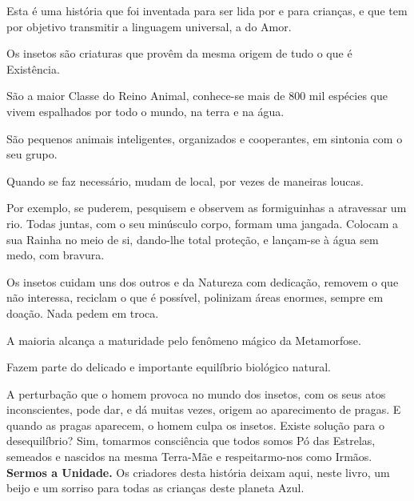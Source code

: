 Esta é uma história que foi inventada para ser lida por e para crianças, e que tem por objetivo transmitir a linguagem universal, a do Amor.

Os insetos são criaturas que provêm da mesma origem de tudo o que é Existência.

São a maior Classe do Reino Animal, conhece-se mais de 800 mil espécies que vivem espalhados por todo o mundo, na terra e na água.

São pequenos animais inteligentes, organizados e cooperantes, em sintonia com o seu grupo.

Quando se faz necessário, mudam de local, por vezes de maneiras loucas.

Por exemplo, se puderem, pesquisem e observem as formiguinhas a atravessar um rio. Todas juntas, com o seu minúsculo corpo, formam uma jangada. Colocam a sua Rainha no meio de si, dando-lhe total proteção, e lançam-se à água sem medo, com bravura.

Os insetos cuidam uns dos outros e da Natureza com dedicação, removem o que não interessa, reciclam o que é possível, polinizam áreas enormes, sempre em doação. Nada pedem em troca.

A maioria alcança a maturidade pelo fenômeno mágico da Metamorfose.

Fazem parte do delicado e importante equilíbrio biológico natural.

A perturbação que o homem provoca no mundo dos insetos, com os seus atos inconscientes, pode dar, e dá muitas vezes, origem ao aparecimento de pragas. E quando as pragas aparecem, o homem culpa os insetos.
\bigbreak
Existe solução para o desequilíbrio?
\bigbreak
Sim, tomarmos consciência que todos somos Pó das Estrelas, semeados e nascidos na mesma Terra-Mãe e respeitarmo-nos como Irmãos.
\bigbreak
\textbf{Sermos a Unidade.}
\bigbreak
Os criadores desta história deixam aqui, neste livro, um beijo e um sorriso para todas as crianças deste planeta Azul.